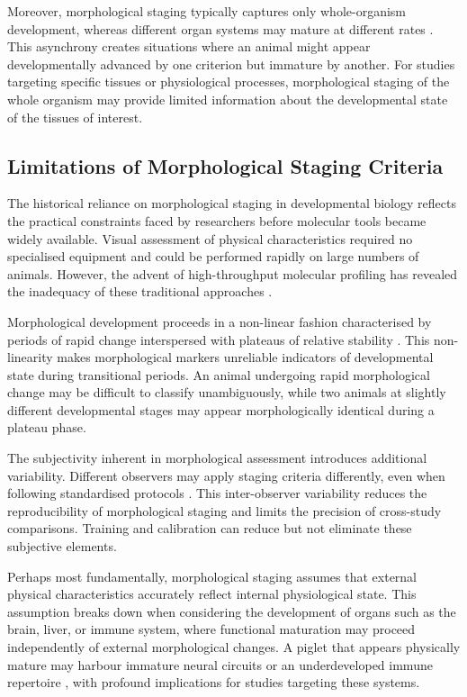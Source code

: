 Moreover, morphological staging typically captures only whole-organism development, whereas different organ systems may mature at different rates \parencite{cardoso-moreira_gene_2019}. This asynchrony creates situations where an animal might appear developmentally advanced by one criterion but immature by another. For studies targeting specific tissues or physiological processes, morphological staging of the whole organism may provide limited information about the developmental state of the tissues of interest.

\subsection{Limitations of Morphological Staging Criteria}

The historical reliance on morphological staging in developmental biology reflects the practical constraints faced by researchers before molecular tools became widely available. Visual assessment of physical characteristics required no specialised equipment and could be performed rapidly on large numbers of animals. However, the advent of high-throughput molecular profiling has revealed the inadequacy of these traditional approaches \parencite{teschendorff_epigenetic_2025}.

Morphological development proceeds in a non-linear fashion characterised by periods of rapid change interspersed with plateaus of relative stability \parencite{boeyer_evidence_2020}. This non-linearity makes morphological markers unreliable indicators of developmental state during transitional periods. An animal undergoing rapid morphological change may be difficult to classify unambiguously, while two animals at slightly different developmental stages may appear morphologically identical during a plateau phase.

The subjectivity inherent in morphological assessment introduces additional variability. Different observers may apply staging criteria differently, even when following standardised protocols \parencite{boeyer_evidence_2020}. This inter-observer variability reduces the reproducibility of morphological staging and limits the precision of cross-study comparisons. Training and calibration can reduce but not eliminate these subjective elements.

Perhaps most fundamentally, morphological staging assumes that external physical characteristics accurately reflect internal physiological state. This assumption breaks down when considering the development of organs such as the brain, liver, or immune system, where functional maturation may proceed independently of external morphological changes. A piglet that appears physically mature may harbour immature neural circuits \parencite{semple_brain_2013} or an underdeveloped immune repertoire \parencite{georgountzou_postnatal_2017, mair_porcine_2014}, with profound implications for studies targeting these systems.

